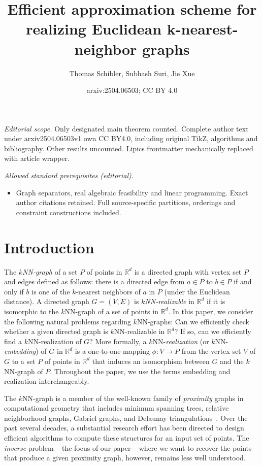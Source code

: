 \documentclass[11pt]{article}
\title{Efficient approximation scheme for realizing Euclidean k-nearest-neighbor graphs}
\author{Thomas Schibler, Subhash Suri, Jie Xue}
\date{arxiv:2504.06503; CC BY 4.0}
\begin{document}
\maketitle
\noindent\textit{Editorial scope.} Only designated main theorem counted. Complete author text under arxiv2504.06503v1 own CC BY4.0, including original TikZ, algorithms and bibliography. Other results uncounted. Lipics frontmatter mechanically replaced with article wrapper.\par\medskip
\noindent\textit{Allowed standard prerequisites (editorial).}\begin{itemize}
\item Graph separators, real algebraic feasibility and linear programming. Exact author citations retained. Full source-specific partitions, orderings and constraint constructions included.
\end{itemize}\medskip
\section{Introduction}

The \textit{$k$NN-graph} of a set $P$ of points in $\mathbb{R}^d$ is a directed graph with vertex set $P$ and edges defined as follows: there is a directed edge from $a \in P$ to $b \in P$ if and only if $b$ is one of the $k$-nearest neighbors of $a$ in $P$ (under the Euclidean distance).
A directed graph $G = (V, E)$ is \textit{$k$NN-realizable} in $\mathbb{R}^d$ if it is isomorphic to the $k$NN-graph of a set of points in $\mathbb{R}^d$.
In this paper, we consider the following natural problems regarding $k$NN-graphs:
Can we efficiently check whether a given directed graph is $k$NN-realizable in $\mathbb{R}^d$?
If so, can we efficiently find a $k$NN-realization of $G$?
More formally, a $k$NN-\emph{realization} (or $k$NN-\emph{embedding}) of $G$ in $\mathbb{R}^d$ is a one-to-one mapping $\phi: V \rightarrow P$ from the vertex set $V$ of $G$ to a set $P$ of points in $\mathbb{R}^d$ that induces an isomorphism between $G$ and the $k$NN-graph of $P$.
Throughout the paper, we use the terms embedding and realization interchangeably.

The $k$NN-graph is a member of the well-known family of \emph{proximity} graphs in computational geometry that includes minimum spanning trees, relative neighborhood graphs, Gabriel graphs, and Delaunay triangulations~\cite{cgbook}. Over the past several decades, a substantial research effort has been directed to design efficient algorithms to compute these structures for an input set of points.  The \emph{inverse} problem -- the focus of our paper -- where we want to recover the points that produce a given proximity graph, however, remains  less well understood.
\end{document}
